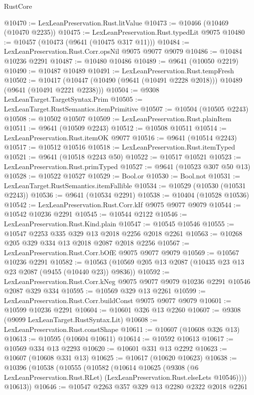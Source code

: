 \begin{lexlean}{RustCore}
\begin{coremodule}
@10470 := LexLeanPreservation.Rust.litValue
@10473 := @10466 (@10469 (@10470 @2235))
@10475 := LexLeanPreservation.Rust.typedLit @9075
@10480 := @10457 (@10473 (@9641 (@10475 @317 @11)))
@10484 := LexLeanPreservation.Rust.Corr.opsNil @9075 @9077 @9079
@10486 := @10484 @10236 @2291
@10487 := @10480 @10486
@10489 := @9641 (@10050 @2219)
@10490 := @10487 @10489
@10491 := LexLeanPreservation.Rust.tempFresh
@10502 := @10417 (@10447 (@10490 (@9641 (@10491 @2228 @2018))) @10489 (@9641 (@10491 @2221 @2238)))
@10504 := @9308 LexLeanTarget.TargetSyntax.Prim
@10505 := LexLeanTarget.RustSemantics.itemPrimitive
@10507 := @10504 (@10505 @2243)
@10508 := @10502 @10507
@10509 := LexLeanPreservation.Rust.plainItem
@10511 := @9641 (@10509 @2243)
@10512 := @10508 @10511
@10514 := LexLeanPreservation.Rust.itemOK @9077
@10516 := @9641 (@10514 @2243)
@10517 := @10512 @10516
@10518 := LexLeanPreservation.Rust.itemTyped
@10521 := @9641 (@10518 @2243 @50)
@10522 := @10517 @10521
@10523 := LexLeanPreservation.Rust.primTyped
@10527 := @9641 (@10523 @307 @50 @13)
@10528 := @10522 @10527
@10529 := Bool.or
@10530 := Bool.not
@10531 := LexLeanTarget.RustSemantics.itemFallible
@10534 := @10529 (@10530 (@10531 @2243))
@10536 := @9641 (@10534 @2291)
@10538 := @10404 (@10528 @10536)
@10542 := LexLeanPreservation.Rust.Corr.kIf @9075 @9077 @9079
@10544 := @10542 @10236 @2291
@10545 := @10544 @2122
@10546 := LexLeanPreservation.Rust.Kind.plain
@10547 := @10545 @10546
@10555 := @10547 @2253 @335 @329 @13 @2018 @2256 @2018 @2261
@10563 := @10268 @205 @329 @334 @13 @2018 @2087 @2018 @2256
@10567 := LexLeanPreservation.Rust.Corr.bOfE @9075 @9077 @9079
@10569 := @10567 @10236 @2291
@10582 := @10563 (@10569 @205 @13 @2087 (@10435 @23 @13 @23 @2087 (@9455 (@10440 @23)) @9836))
@10592 := LexLeanPreservation.Rust.Corr.kNeg @9075 @9077 @9079 @10236 @2291 @10546 @2087 @329 @334
@10595 := @10569 @329 @13 @2261
@10599 := LexLeanPreservation.Rust.Corr.buildConst @9075 @9077 @9079
@10601 := @10599 @10236 @2291
@10604 := @10601 @326 @13 @2260
@10607 := @9308 (@9099 LexLeanTarget.RustSyntax.Lit)
@10608 := LexLeanPreservation.Rust.constShape
@10611 := @10607 (@10608 @326 @13)
@10613 := @10595 (@10604 @10611)
@10614 := @10592 @10613
@10617 := @10569 @334 @13 @2293
@10620 := @10601 @331 @13 @2292
@10623 := @10607 (@10608 @331 @13)
@10625 := @10617 (@10620 @10623)
@10638 := @10396
    (@10538
      (@10555
        (@10582
          (@10614
            @10625
            (@9308 (@6 LexLeanPreservation.Rust.RLet) (LexLeanPreservation.Rust.elseLets @10546))))
        @10613))
@10646 := @10547 @2263 @357 @329 @13 @2280 @2322 @2018 @2261

\end{coremodule}
\end{lexlean}
